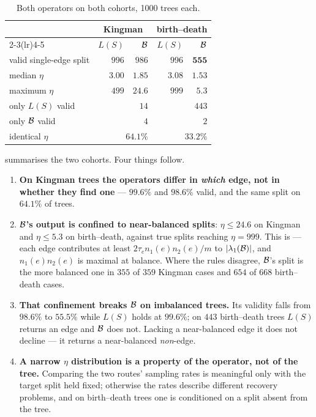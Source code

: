 \begin{table}[htbp]
\centering
\caption{Both operators on both cohorts, 1000 trees each.}
\label{tab:eta-agreement}
\begin{tabular}{lrrrr}
\toprule
& \multicolumn{2}{c}{Kingman} & \multicolumn{2}{c}{birth--death}\\
\cmidrule(lr){2-3}\cmidrule(lr){4-5}
& $L(S)$ & $\mathcal{B}$ & $L(S)$ & $\mathcal{B}$\\
\midrule
valid single-edge split & $996$ & $986$ & $996$ & $\mathbf{555}$\\
median $\eta$           & $3.00$ & $1.85$ & $3.08$ & $1.53$\\
maximum $\eta$          & $499$  & $24.6$ & $999$  & $5.3$\\
\midrule
only $L(S)$ valid       & \multicolumn{2}{r}{$14$}  & \multicolumn{2}{r}{$443$}\\
only $\mathcal{B}$ valid       & \multicolumn{2}{r}{$4$}   & \multicolumn{2}{r}{$2$}\\
identical $\eta$        & \multicolumn{2}{r}{$64.1\%$} & \multicolumn{2}{r}{$33.2\%$}\\
\bottomrule
\end{tabular}
\end{table}

\noindent {} summarises the two cohorts. Four things follow.

\begin{enumerate}[leftmargin=2em, itemsep=3pt, topsep=3pt]
\item \textbf{On Kingman trees the operators differ in \emph{which} edge, not in whether
      they find one} --- $99.6\%$ and $98.6\%$ valid, and the same split on $64.1\%$ of
      trees.
\item \textbf{$\mathcal{B}$'s output is confined to near-balanced splits}: $\eta\le24.6$ on
      Kingman and $\eta\le5.3$ on birth--death, against true splits reaching $\eta=999$.
      This is  --- each edge contributes at least
      $2\tau_e n_1(e)n_2(e)/m$ to $|\lambda_1(\mathcal{B})|$, and $n_1(e)n_2(e)$ is maximal at
      balance. Where the rules disagree, $\mathcal{B}$'s split is the more balanced one in $355$
      of $359$ Kingman cases and $654$ of $668$ birth--death cases.
\item \textbf{That confinement breaks $\mathcal{B}$ on imbalanced trees.} Its validity falls from
      $98.6\%$ to $55.5\%$ while $L(S)$ holds at $99.6\%$; on $443$ birth--death trees
      $L(S)$ returns an edge and $\mathcal{B}$ does not. Lacking a near-balanced edge it does not
      decline --- it returns a near-balanced \emph{non}-edge.
\item \textbf{A narrow $\eta$ distribution is a property of the operator, not of the
      tree.} Comparing the two routes' sampling rates is meaningful only with the target
      split held fixed; otherwise the rates describe different recovery problems, and on
      birth--death trees one is conditioned on a split absent from the tree.
\end{enumerate}
